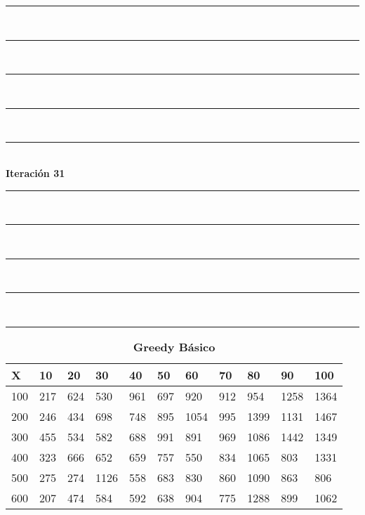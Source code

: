 \documentclass[10pt,letterpaper]{article}
\begin{document}
\newpage 
\begin{center}
\newcommand{\HRule}{\rule{\linewidth}{0.5mm}}
\center
\HRule\\[6cm]
\HRule\\[0.4cm]
\HRule\\[0.4cm]
\HRule\\[0.4cm]
\HRule\\[0.4cm]
{\centering \Huge\bfseries Iteración 31}\\[0.4cm]
\HRule\\[0.4cm]
\HRule\\[0.4cm]
\HRule\\[0.4cm]
\HRule\\[6cm]
\HRule
\end{center}
\newpage 
{}
\begin{center}
\begin{table}\renewcommand{\arraystretch}{2.5}
\caption{\large \textbf{Greedy Básico}}
\centering
\begin{tabular} { |m{0.5cm}|m{1.3cm}|m{1.3cm}|m{1.3cm}|m{1.3cm}|m{1.3cm}|m{1.3cm}|m{1.3cm}|m{1.3cm}|m{1.3cm}|m{1.3cm}|} 
\hline
\rowcolor{Gray}
\centering \textbf{X} & \centering \textbf{10} & \centering \textbf{20} & \centering \textbf{30}\ & \centering \textbf{40} & \centering \textbf{50} & \centering \textbf{60}\ & \centering \textbf{70} & \centering \textbf{80} & \centering \textbf{90}\ & \textbf{100} \\\hline
\cellcolor{Gray}100 & \Large 217 & \Large 624 & \Large 530 & \Large 961 & \Large 697 & \Large 920 & \Large 912 & \Large 954 & \Large 1258 & \Large 1364 \\
\hline
\cellcolor{Gray}200 & \Large 246 & \Large 434 & \Large 698 & \Large 748 & \Large 895 & \Large 1054 & \Large 995 & \Large 1399 & \Large 1131 & \Large 1467 \\
\hline
\cellcolor{Gray}300 & \Large 455 & \Large 534 & \Large 582 & \Large 688 & \Large 991 & \Large 891 & \Large 969 & \Large 1086 & \Large 1442 & \Large 1349 \\
\hline
\cellcolor{Gray}400 & \Large 323 & \Large 666 & \Large 652 & \Large 659 & \Large 757 & \Large 550 & \Large 834 & \Large 1065 & \Large 803 & \Large 1331 \\
\hline
\cellcolor{Gray}500 & \Large 275 & \Large 274 & \Large 1126 & \Large 558 & \Large 683 & \Large 830 & \Large 860 & \Large 1090 & \Large 863 & \Large 806 \\
\hline
\cellcolor{Gray}600 & \Large 207 & \Large 474 & \Large 584 & \Large 592 & \Large 638 & \Large 904 & \Large 775 & \Large 1288 & \Large 899 & \Large 1062 \\

\end{tabular}
\end{table}
\end{center}
\end{document}
